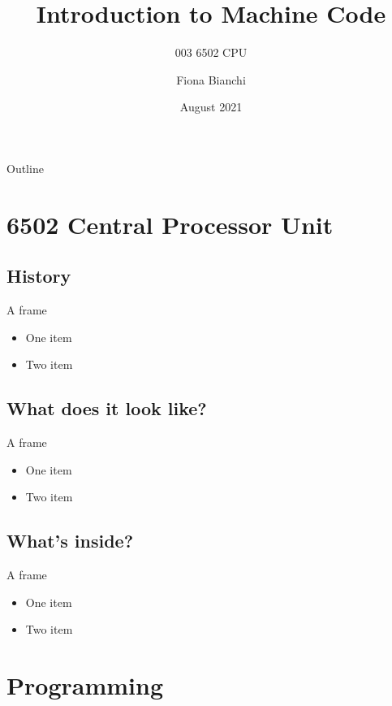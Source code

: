 \documentclass{beamer}
\title{Introduction to Machine Code}
\subtitle{003 6502 CPU}
\author{Fiona Bianchi}
\institute{HiKlas Ltd}
\date{August 2021}
\begin{document}
\begin{frame}
  \titlepage
\end{frame}

\begin{frame}{Outline}
  \tableofcontents
\end{frame}


\section{6502 Central Processor Unit}

\subsection[History]{History}

\begin{frame}{A frame}
  \begin{itemize}
  \item
    One item
  \item
    Two item
  \end{itemize}
\end{frame}


\subsection[Appearance]{What does it look like?}

\begin{frame}{A frame}
  \begin{itemize}
  \item
    One item
  \item
    Two item
  \end{itemize}
\end{frame}


\subsection[Internals]{What's inside?}

\begin{frame}{A frame}
  \begin{itemize}
  \item
    One item
  \item
    Two item
  \end{itemize}
\end{frame}


\section{Programming}
\end{document}

